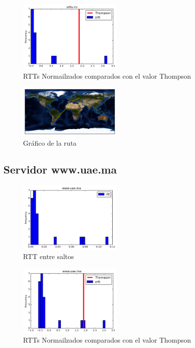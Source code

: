 \begin{figure}[H]
  \centering
    \includegraphics[width=0.45\textwidth]{histogramas_thompson/udsu-ru.png}
  \caption{RTTs Normailzados comparados con el valor Thompson}
  \label{entropia-s}
\end{figure}

\begin{figure}[H]
  \centering
    \includegraphics[width=0.45\textwidth]{grafico-rutas/udsu-ru.png}
  \caption{Gráfico de la ruta}
  \label{entropia-s}
\end{figure}




\subsection{Servidor www.uae.ma}
\begin{figure}[H]
  \centering
    \includegraphics[width=0.45\textwidth]{histogramas_rtt/www-uae-ma.png}
  \caption{RTT entre saltos}
  \label{entropia-s}
\end{figure}

\begin{figure}[H]
  \centering
    \includegraphics[width=0.45\textwidth]{histogramas_thompson/www-uae-ma.png}
  \caption{RTTs Normailzados comparados con el valor Thompson}
  \label{entropia-s}
\end{figure}

